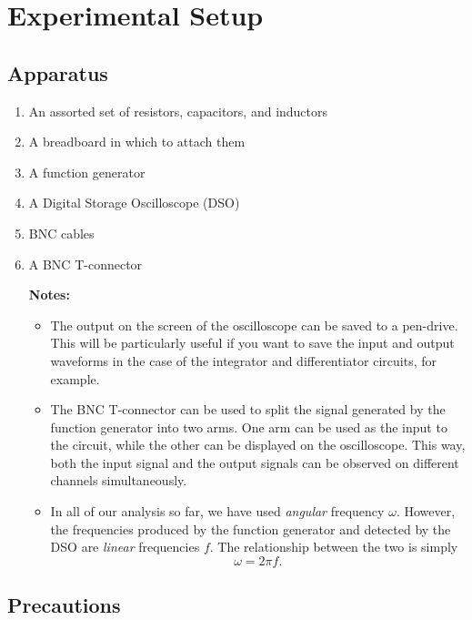 \section*{Experimental Setup}

\subsection*{Apparatus}

\begin{enumerate}[label=\arabic*)]
\itemsep0em
\item An assorted set of resistors, capacitors, and inductors
\item A breadboard in which to attach them
\item A function generator
\item A Digital Storage Oscilloscope (DSO)
\item BNC cables
\item A BNC T-connector

\vspace{\parskip}
\begin{imp}
\textbf{Notes:}
\begin{itemize}
    \item The output on the screen of the oscilloscope can be saved to a pen-drive. This will be particularly useful if you want to save the input and output waveforms in the case of the integrator and differentiator circuits, for example.
    \item The BNC T-connector can be used to split the signal generated by the function generator into two arms. One arm can be used as the input to the circuit, while the other can be displayed on the oscilloscope. This way, both the input signal and the output signals can be observed on different channels simultaneously.
    \item In all of our analysis so far, we have used \textsl{angular} frequency $\omega$. However, the frequencies produced by the function generator and detected by the DSO are \textsl{linear} frequencies $f$. The relationship between the two is simply
    \begin{equation}
        \omega = 2 \pi f.
    \end{equation}
\end{itemize}
\end{imp}

\end{enumerate}

\subsection*{Precautions}

